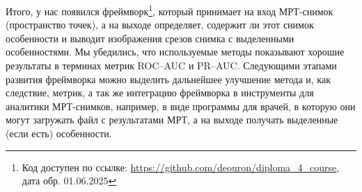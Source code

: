\documentclass[a4paper,12pt]{extarticle}
\begin{document}
Итого, у нас появился фреймворк\footnote{Код доступен по ссылке: \url{https://github.com/deouron/diploma_4_course}, дата обр. 01.06.2025}, который принимает на вход МРТ-снимок (пространство точек), а на выходе определяет, содержит ли этот снимок особенности и выводит изображения срезов снимка с выделенными особенностями. Мы убедились, что используемые методы показывают хорошие результаты в терминах метрик ROC–AUC и PR–AUC. Следующими этапами развития фреймворка можно выделить дальнейшее улучшение метода и, как следствие, метрик, а так же интеграцию фреймворка в инструменты для аналитики МРТ-снимков, например, в виде программы для врачей, в которую они могут загружать файл с результатами МРТ, а на выходе получать выделенные (если есть) особенности. 

\pagebreak
	
\newpage 
\printbibliography[heading=bibintoc] 

\end{document}
